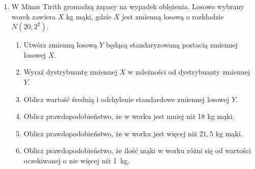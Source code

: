 \documentclass[twoside]{mwart}
\newcommand{\ans}[1]{}
\newcommand{\ans}[1]{\par\emph{Odpowiedź:} #1}
\begin{document}
\begin{enumerate}
\item W Minas Tirith gromadzą zapasy na wypadek oblężenia. Losowo wybrany worek zawiera $X$ kg mąki, gdzie $X$ jest zmienną losową o rozkładzie $N(20,2^2)$.
\begin{enumerate}
\item Utwórz zmienną losową $Y$ będącą standaryzowaną postacią zmiennej losowej $X$. \ans{$Y=\frac{X-20}{2}$}
\item Wyraź dystrybuantę zmiennej $X$ w zależności od dystrybuanty zmiennej $Y$. \ans{$F_X(x)=F_Y(\frac{x-20}{2})$}
\item Oblicz wartość średnią i odchylenie standardowe zmiennej losowej $Y$.
\item Oblicz prawdopodobieństwo, że w worku jest mniej niż 18 kg mąki. \ans{$P(X<18)=F_X(18)=F_Y(-1)=1-F_Y(1)=1-0{,}8413\approx 0{,}16$}
\item Oblicz prawdopodobieństwo, że w worku jest więcej niż $21{,}5$ kg mąki. \ans{$P(X>21{,}5)=1-F_X(21{,}5)=1-F_Y(0{,}75)=1-0{,}7734\approx 0{,}23$}
\item Oblicz prawdopodobieństwo, że ilość mąki w worku różni się od wartości oczekiwanej o nie więcej niż 1~kg. \ans{$P(19<X<21)=F_X(21)-F_X(19)=F_Y(0{,}5)-F_Y(-0{,}5)=2F_Y(0{,}5)-1=2\cdot0{,}6915-1=0{,}38$}
\end{enumerate}

\end{enumerate}
\end{document}
